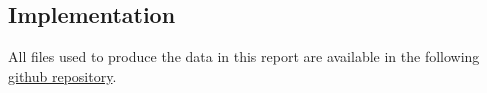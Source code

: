 \subsection{Implementation}


All files used to produce the data in this report are available in the following \href{https://github.com/kellertuer/TMA4500-Project-Hovland-Symplectic-Stiefel.git}{github repository}\cite{Hovland2024}. 